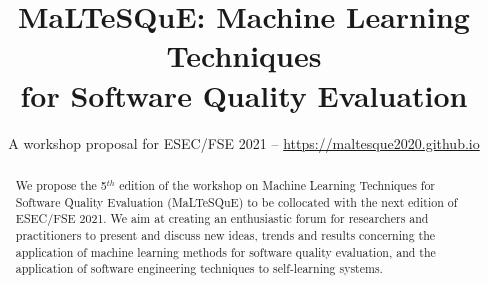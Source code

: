 \documentclass[sigconf]{acmart}
\begin{document}
\title{MaLTeSQuE: Machine Learning Techniques\\for Software Quality Evaluation}
\subtitle{A workshop proposal for ESEC/FSE 2021 -- \url{https://maltesque2020.github.io}}



\begin{abstract}
We propose the 5$^{th}$ edition of the workshop on Machine Learning Techniques for Software Quality Evaluation (MaLTeSQuE) to be collocated with the next edition of ESEC/FSE 2021.
We aim at creating an enthusiastic forum for researchers and practitioners to present and discuss new ideas, trends and results concerning the application of machine learning methods for software quality evaluation, and the application of software engineering techniques to self-learning systems.
\end{abstract}


\maketitle








\balance

	
\end{document}
